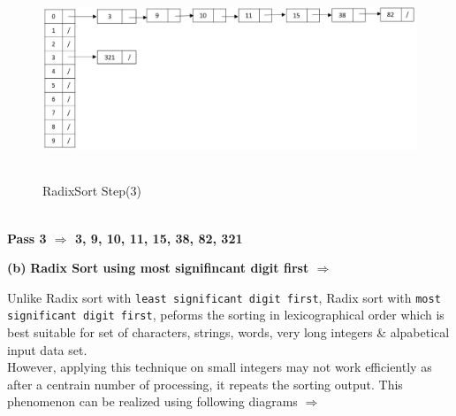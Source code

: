 \documentclass[11pt]{article}
\renewcommand\part[1]{\vspace{.10in}\textbf{(#1)}}
\begin{document}
\begin{itemize}
\begin{figure}[h]
			\includegraphics[width=140mm, height=60mm]{radixsort03.JPG}
			\caption{RadixSort Step(3) \label{overflow}}
		\end{figure}	
		\\
		\textbf{Pass 3 $\Rightarrow$ 3, 9, 10, 11, 15, 38, 82, 321}
\end{itemize} 
\newpage
\part{b} \textbf{Radix Sort using most signifincant digit first $\Rightarrow$} 

Unlike Radix sort with \texttt{least significant digit first}, Radix sort with \texttt{most significant digit first}, peforms the sorting in lexicographical order which is best suitable for set of characters, strings, words, very long integers \& alpabetical input data set. 
\newline \\
However, applying this technique on small integers may not work efficiently as after a centrain number of processing, it repeats the sorting output. This phenomenon can be realized using following diagrams $\Rightarrow$
\end{document}
